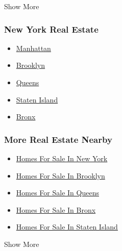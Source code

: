 Show More

\hypertarget{new-york-real-estate}{%
\subsubsection{New York Real Estate}\label{new-york-real-estate}}

\begin{itemize}
\tightlist
\item
  \href{/real-estate/usa/ny/new-yorknew-york-ny-usa/homes-for-sale}{Manhattan}
\item
  \href{/real-estate/usa/ny/brooklynbrooklyn-ny-usa/homes-for-sale}{Brooklyn}
\item
  \href{/real-estate/usa/ny/queensqueens-ny-usa/homes-for-sale}{Queens}
\item
  \href{/real-estate/usa/ny/staten-islandstaten-island-ny-usa/homes-for-sale}{Staten
  Island}
\item
  \href{/real-estate/usa/ny/bronxbronx-ny-usa/homes-for-sale}{Bronx}
\end{itemize}

\hypertarget{more-real-estate-nearby}{%
\subsubsection{More Real Estate Nearby}\label{more-real-estate-nearby}}

\begin{itemize}
\tightlist
\item
  \href{/real-estate/usa/ny/new-yorknew-york-ny-usa/homes-for-sale}{Homes
  For Sale In New York}
\item
  \href{/real-estate/usa/ny/brooklynbrooklyn-ny-usa/homes-for-sale}{Homes
  For Sale In Brooklyn}
\item
  \href{/real-estate/usa/ny/queensqueens-ny-usa/homes-for-sale}{Homes
  For Sale In Queens}
\item
  \href{/real-estate/usa/ny/bronxbronx-ny-usa/homes-for-sale}{Homes For
  Sale In Bronx}
\item
  \href{/real-estate/usa/ny/staten-islandstaten-island-ny-usa/homes-for-sale}{Homes
  For Sale In Staten Island}
\end{itemize}

Show More

